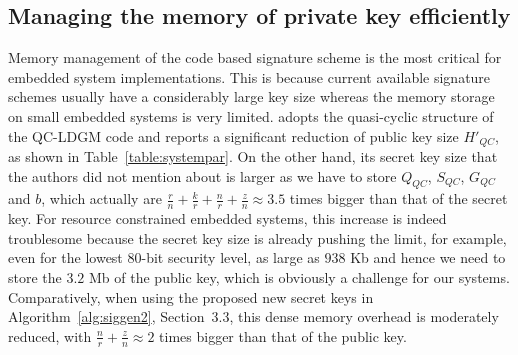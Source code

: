 \documentclass[10pt,journal,compsoc]{IEEEtran}
\begin{document}
\subsection{Managing the memory of private key efficiently}
Memory management of the code based signature scheme is the most critical for embedded system implementations.
This is because current available signature schemes\cite{courtois2001achieve,landais2012cfs,finiasz2011parallel,baldi2013using}  usually have a considerably large key size whereas
the memory storage on small embedded systems is very limited. \cite{baldi2013using} adopts the quasi-cyclic structure of the QC-LDGM code and reports a significant reduction of public key size $H'_{QC}$, as shown in Table~\ref{table:systempar}. On the other hand, its secret key size that the authors did not mention about is larger as we have to store $Q_{QC}$, $S_{QC}$, $G_{QC}$ and $b$, which actually are $\frac{r}{n}+\frac{k}{r}+\frac{n}{r}+\frac{z}{n}\approx 3.5$ times bigger than that of the secret key. For resource constrained embedded systems, this increase is indeed troublesome because the secret key size is already pushing the limit, for example, even for the lowest 80-bit security level, as large as $938$ Kb and hence we need to store the $3.2$ Mb of the public key, which is obviously a challenge for our systems. Comparatively, when using the proposed new secret keys in Algorithm~\ref{alg:siggen2}, Section~3.3, this dense memory overhead is moderately reduced, with $\frac{n}{r}+\frac{z}{n} \approx 2$ times bigger than that of the public key.
\end{document}
